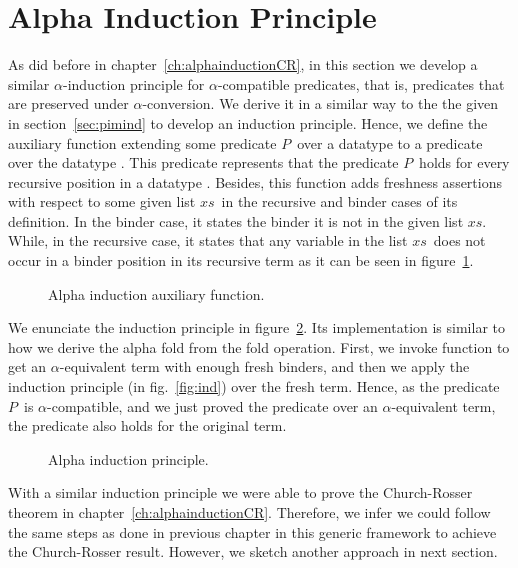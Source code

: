 \documentclass{book}
\newcommand{\alp}{\ensuremath{\alpha}}
\begin{document}
{\section{Alpha Induction Principle}

As did before in chapter~\ref{ch:alphainductionCR}, in this section we develop a similar \alp-induction principle for \alp-compatible predicates, that is, predicates that are preserved under \alp-conversion. We derive it in a similar way to the the given in section~\ref{sec:pimind} to develop an induction principle. Hence, we define the auxiliary function  extending some predicate $P$\ over a datatype  to a predicate over the datatype . This predicate represents that the predicate $P$\ holds for every recursive position  in a datatype . Besides, this function adds freshness assertions with respect to some given list $xs$\ in the recursive and binder cases of its definition. In the binder case, it states the binder it is not in the given list $xs$. While, in the recursive case, it states that any variable in the list $xs$\ does not occur in a binder position in its recursive term as it can be seen in figure~\ref{fig:alphaindaux}.


\begin{figure}[h!]
  \caption{Alpha induction auxiliary function.}
\label{fig:alphaindaux}
\end{figure}


We enunciate the induction principle in figure~\ref{fig:alphaind}. Its implementation is similar to how we derive the alpha fold from the fold operation. First, we invoke function  to get an \alp-equivalent term with enough fresh binders, and then we apply the induction principle (in fig.~\ref{fig:ind}) over the fresh term. Hence, as the predicate $P$\ is \alp-compatible, and we just proved the predicate over an \alp-equivalent term, the predicate also holds for the original term.

\begin{figure}[h!]
  \caption{Alpha induction principle.}
\label{fig:alphaind}
\end{figure}

With a similar induction principle we were able to prove the Church-Rosser theorem in chapter~\ref{ch:alphainductionCR}. Therefore, we infer we could follow the same steps as done in previous chapter in this generic framework to achieve the Church-Rosser result. However, we sketch another approach in next section.

}
\end{document}
